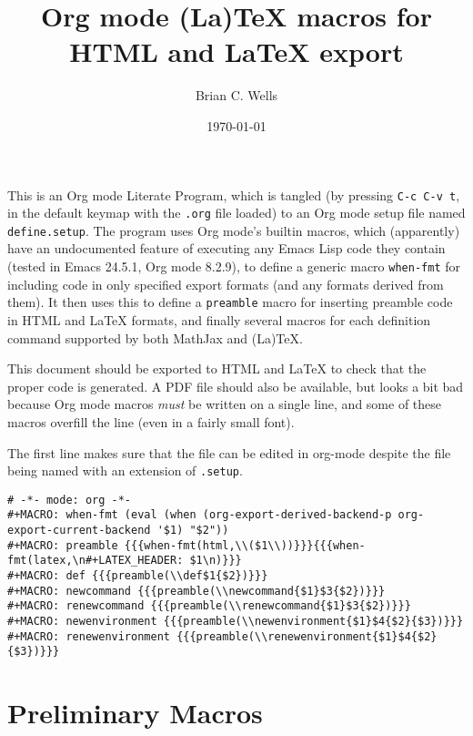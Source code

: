 \documentclass[11pt]{article}
\author{Brian C. Wells}
\date{\today}
\title{Org mode (La)\TeX{} macros for HTML and \LaTeX{} export}
\begin{document}
\maketitle
\tableofcontents

This is an Org mode Literate Program, which is tangled (by pressing
\verb~C-c C-v t~, in the default keymap with the \verb~.org~ file loaded) to an
Org mode setup file named \verb~define.setup~.  The program uses Org mode's
builtin macros, which (apparently) have an undocumented feature of
executing any Emacs Lisp code they contain (tested in Emacs 24.5.1,
Org mode 8.2.9), to define a generic macro \verb~when-fmt~ for including
code in only specified export formats (and any formats derived from
them).  It then uses this to define a \verb~preamble~ macro for inserting
preamble code in HTML and \LaTeX{} formats, and finally several macros
for each definition command supported by both MathJax and (La)\TeX{}.

This document should be exported to HTML and \LaTeX{} to check that the
proper code is generated.  A PDF file should also be available, but
looks a bit bad because Org mode macros \emph{must} be written on a single
line, and some of these macros overfill the line (even in a fairly
small font).

The first line makes sure that the file can be edited in org-mode
despite the file being named with an extension of \verb~.setup~.

\begin{verbatim}
# -*- mode: org -*-
#+MACRO: when-fmt (eval (when (org-export-derived-backend-p org-export-current-backend '$1) "$2"))
#+MACRO: preamble {{{when-fmt(html,\\($1\\))}}}{{{when-fmt(latex,\n#+LATEX_HEADER: $1\n)}}}
#+MACRO: def {{{preamble(\\def$1{$2})}}}
#+MACRO: newcommand {{{preamble(\\newcommand{$1}$3{$2})}}}
#+MACRO: renewcommand {{{preamble(\\renewcommand{$1}$3{$2})}}}
#+MACRO: newenvironment {{{preamble(\\newenvironment{$1}$4{$2}{$3})}}}
#+MACRO: renewenvironment {{{preamble(\\renewenvironment{$1}$4{$2}{$3})}}}
\end{verbatim}

\section{Preliminary Macros}
\label{sec-1}
\end{document}
